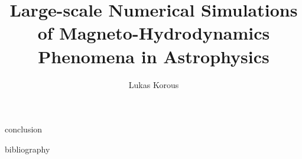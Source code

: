 \documentclass[11pt,a4paper,oneside,footinclude=true,headinclude=true]{scrbook}
\title{Large-scale Numerical Simulations of Magneto-Hydrodynamics Phenomena in Astrophysics}
\author{Lukas Korous}
\begin{document}














 {conclusion}

 {bibliography}
		
\end{document}
